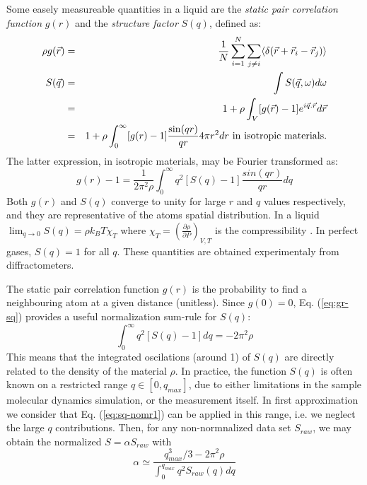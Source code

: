 Some easely measureable quantities in a liquid are the \emph{static pair correlation function} $g(r)$ and the \emph{structure factor} $S(q)$, defined as:
\begin{eqnarray}
\rho g(\vec{r}) &=& \frac{1}{N} \sum_{i=1}^N \sum_{j \neq i} \langle \delta(\vec{r}+\vec{r}_i-\vec{r}_j) \rangle \\
S(\vec{q}) &=&\int S(\vec q,\omega) d\omega \label{eq:sq} \\
           &=&1 + \rho \int_V [g(\vec{r})-1] e^{i\vec{q}.\vec{r}} d\vec{r} \\
           &=&1 + \rho \int_{0}^{\infty} [g(r)-1] \frac{\sin(qr)}{qr} 4 \pi r^2 dr {\rm\ in\ isotropic\ materials.}
\end{eqnarray}
The latter expression, in isotropic materials, may be Fourier transformed as:
\begin{equation}
\label{eq:gr-sq}
g(r)-1 =\frac{1}{2\pi^2 \rho} \int_0^\infty q^2 [S(q) -1] \frac{sin(qr)}{qr} dq
\end{equation}
Both $g(r)$ and $S(q)$ converge to unity for large $r$ and $q$ values respectively, and they are representative of the atoms spatial distribution. In a liquid $\lim_{q \rightarrow 0} S(q) = \rho k_B T \chi_T$ where $\chi_T=(\frac{\partial \rho}{\partial P})_{V,T}$ is the compressibility \cite{Egelstaff67}. In perfect gases, $S(q) = 1$ for all $q$. These quantities are obtained experimentaly from diffractometers.

The static pair correlation function $g(r)$ is the probability to find a neighbouring atom at a given distance (unitless). Since $g(0) = 0$, Eq. (\ref{eq:gr-sq}) provides a useful normalization sum-rule for $S(q)$:
\begin{equation}
\label{eq:sq-nomr1}
\int_0^\infty q^2 [S(q) - 1] dq = -2\pi^2\rho
\end{equation}
This means that the integrated oscilations (around 1) of $S(q)$ are directly related to the density of the material $\rho$.
In practice, the function $S(q)$ is often known on a restricted range $q \in [0, q_{max} ]$, due to either limitations in the sample molecular dynamics simulation, or the measurement itself.
In first approximation we consider that Eq. (\ref{eq:sq-nomr1}) can be applied in this range, i.e. we neglect the large $q$ contributions. Then, for any non-normnalized data set $S_{raw}$, we may obtain the normalized $S = \alpha S_{raw}$ with
\begin{equation}
\label{eq:sq-nomr2}
\alpha \simeq \frac{q^3_{max}/3 - 2\pi^2 \rho}{\int_0^{q_{max}} q^2 S_{raw}(q) dq }
\end{equation}

